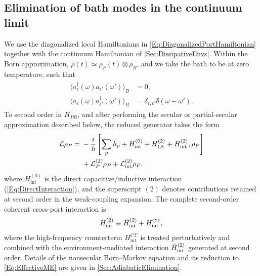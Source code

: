 \documentclass[prx,aps,twocolumn,article]{revtex4-2}
\begin{document}
\subsection{Elimination of bath modes in the continuum limit}

We use the diagonalized local Hamiltonians in
\cref{Eq:DiagonalizedPortHamiltonian} together with the continuum
Hamiltonian of \cref{Sec:DissipativeEnvs}. Within the Born approximation,
$\rho(t)\simeq\rho_P(t)\otimes\rho_B$, and we take the bath to be at zero
temperature, such that
\begin{align}
\begin{aligned}
    \langle
        a^\dag_\epsilon(\omega)
        a_{\epsilon'}(\omega')
    \rangle_B
    &=0,
    \\
    \langle
        a_\epsilon(\omega)
        a^\dag_{\epsilon'}(\omega')
    \rangle_B
    &=
    \delta_{\epsilon,\epsilon'}
    \delta(\omega-\omega').
\end{aligned}
\label{Eq:BathCorrelator}
\end{align}
To second order in $H_{PB}$, and after performing the secular or partial-secular
approximation described below, the reduced generator takes the form
\begin{align}
\begin{aligned}
    \mathcal L\rho_P
    ={}&
    -\frac{i}{\hbar}
    \left[
        \sum_p h_p
        +
        H_{\mathrm{int}}^{(0)}+H_{\rm LS}^{(2)}
        +
        H_{\rm int}^{(2)},
        \rho_P
    \right]
    \\
    & +
    \mathcal L_P^{(2)}\rho_P
    +
    \mathcal L_{\rm int}^{(2)}\rho_P,
\end{aligned}
\label{Eq:EffectiveME}
\end{align}
where
$H_{\mathrm{int}}^{(0)}$ is the direct capacitive/inductive interaction (\ref{Eq:DirectInteraction}), and the superscript $(2)$ denotes contributions retained at second order in the weak-coupling expansion. The complete second-order coherent cross-port interaction is
\begin{align}
    H_{\rm int}^{(2)}
    \equiv
    \tilde{H}_{\rm int}^{(2)}
    +
    H_{\mathrm{int}}^{\mathrm{CT}},
\label{Eq:MEInteractionSplit}
\end{align}
where the high-frequency counterterm $H_{\mathrm{int}}^{\mathrm{CT}}$ is treated perturbatively and combined with the environment-mediated interaction $\tilde{H}_{\rm int}^{(2)}$ generated at second order. Details of the nonsecular Born--Markov equation and its reduction to \cref{Eq:EffectiveME} are given in \cref{Sec:AdiabaticElimination}.
\end{document}
